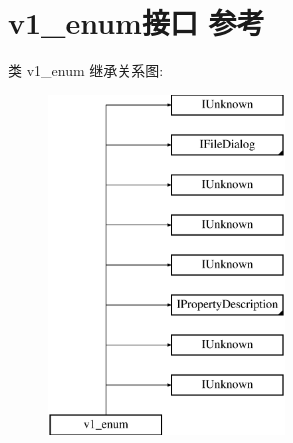 \hypertarget{interfacev1__enum}{}\section{v1\+\_\+enum接口 参考}
\label{interfacev1__enum}
类 v1\+\_\+enum 继承关系图\+:\begin{figure}[H]
\begin{center}
\leavevmode
\includegraphics[height=9.000000cm]{interfacev1__enum}
\end{center}
\end{figure}
